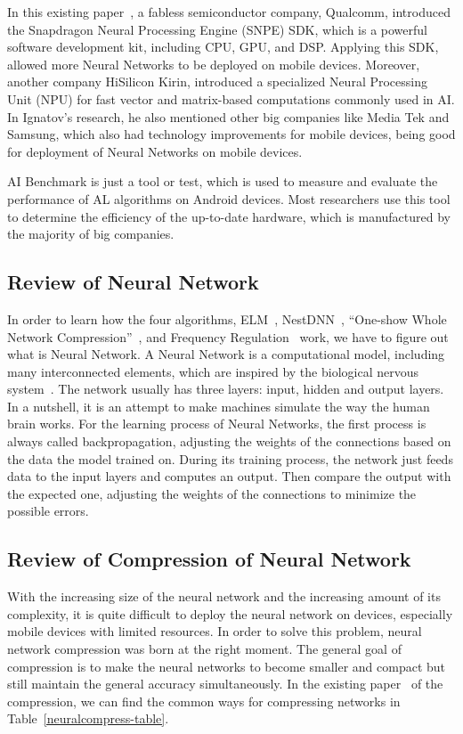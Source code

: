 \documentclass{article}
\begin{document}
In this existing paper~\cite{Andrey2019Aibenchmark},  a fabless semiconductor company, Qualcomm, introduced the Snapdragon Neural Processing Engine (SNPE) SDK, which is a powerful software development kit, including CPU, GPU, and DSP. Applying this SDK, allowed more Neural Networks to be deployed on mobile devices. Moreover, another company HiSilicon Kirin, introduced a specialized Neural Processing Unit (NPU) for fast vector and matrix-based computations commonly used in AI. In Ignatov’s research, he also mentioned other big companies like Media Tek and Samsung, which also had technology improvements for mobile devices, being good for deployment of Neural Networks on mobile devices.

AI Benchmark is just a tool or test, which is used to measure and evaluate the performance of AL algorithms on Android devices. Most researchers use this tool to determine the efficiency of the up-to-date hardware, which is manufactured by the majority of big companies. 

\subsection{Review of Neural Network}

In order to learn how the four algorithms, ELM~\cite{akusok2019metal}, NestDNN~\cite{fang2018nestdnn}, “One-show Whole Network Compression”~\cite{kim2016compression}, and Frequency Regulation~\cite{zhao2023frequency} work, we have to figure out what is Neural Network. A Neural Network is a computational model, including many interconnected elements, which are inspired by the biological nervous system~\cite{picton1994neural}. The network usually has three layers: input, hidden and output layers. In a nutshell, it is an attempt to make machines simulate the way the human brain works. For the learning process of Neural Networks, the first process is always called backpropagation, adjusting the weights of the connections based on the data the model trained on. During its training process, the network just feeds data to the input layers and computes an output. Then compare the output with the expected one, adjusting the weights of the connections to minimize the possible errors.

\subsection{Review of Compression of Neural Network}

With the increasing size of the neural network and the increasing amount of its complexity, it is quite difficult to deploy the neural network on devices, especially mobile devices with limited resources. In order to solve this problem, neural network compression was born at the right moment. The general goal of compression is to make the neural networks to become smaller and compact but still maintain the general accuracy simultaneously. In the existing paper~\cite{neill2020overview} of the compression, we can find the common ways for compressing networks in Table~\ref{neuralcompress-table}. 
\end{document}

